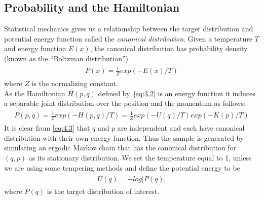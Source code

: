 \documentclass{article}
\numberwithin{equation}{section}
\begin{document}
\subsection{Probability and the Hamiltonian}\label{prob}
Statistical mechanics gives us a relationship between the target distribution and potential energy function called the \textit{canonical distribution}. Given a temperature $T$ and energy function $E(x)$, the canonical distribution has probability density (known as the ``Boltzman distribution'')
\begin{align}
\begin{split}
P(x) = \frac{1}{Z}exp(-E(x)/T)
\end{split}
\label{eq:4.1}
\end{align}
where $Z$ is the normalizing constant.\\
As the Hamiltonian $H(p,q)$ defined by~\ref{eq:3.2}  is an energy function it induces a separable joint distribution over the position and the momentum as follows:
\begin{align}
\begin{split}
P(p,q) = \frac{1}{Z}exp(-H(p,q)/T) = \frac{1}{Z}exp(-U(q)/T)exp(-K(p)/T)
\end{split}
\label{eq:4.2}
\end{align}
It is clear from \ref{eq:4.3} that $q$ and $p$ are independent and each have canonical distribution with their own energy function. Thus the sample is generated by simulating an ergodic Markov chain that has the canonical distribution for $(q,p)$ as its stationary distribution.
We set the temperature equal to 1, unless we are using some tempering methods and define the potential energy to be
\begin{align}
\begin{split}
U(q) = -log \big[P(q)\big]
\end{split}
\label{eq:4.4}
\end{align}
where $P(q)$ is the target distribution of interest.
\end{document}
